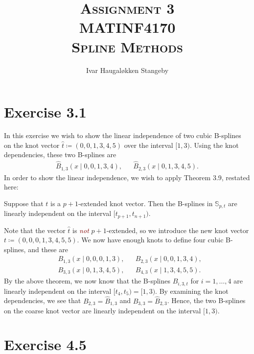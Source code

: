 \documentclass{article}
\title{\textsc{Assignment 3 \\
       MATINF4170 \\
       Spline Methods}
}
\author{Ivar Haugal{\o}kken Stangeby}
\renewcommand{\S}{\mathbb{S}}
\let\oldemph\emph
\renewcommand{\emph}[1]{\textcolor{Maroon}{\oldemph{#1}}}
\begin{document}
    \maketitle 
    
    \section*{Exercise 3.1}
    
    In this exercise we wish to show the linear independence of two cubic
    B-splines on the knot vector $\hat{t} \coloneqq (0, 0, 1, 3, 4, 5)$ over
    the interval $[1, 3)$. Using the knot dependencies, these two B-splines are
    \begin{align*}
        \hat{B}_{1, 3}(x \mid 0, 0, 1, 3, 4), && \hat{B}_{2, 3}(x \mid 0, 1, 3,
        4, 5).
    \end{align*}
    In order to show the linear independence, we wish to apply Theorem 3.9,
    restated here:
    
    \begin{theorem}[3.9]
        Suppose that $t$ is a $p + 1$-extended knot vector. Then the B-splines
        in $\S_{p, t}$ are linearly independent on the interval $[t_{p+1},
        t_{n+1})$.
    \end{theorem}
    
    Note that the vector $\hat{t}$ is \emph{not} $p+1$-extended, so we
    introduce the new knot vector $t \coloneqq (0, 0, 0, 1, 3, 4, 5, 5)$.  We
    now have enough knots to define four cubic B-splines, and these are
    \begin{align*}
        &B_{1, 3}(x \mid 0, 0, 0, 1, 3), & &B_{2, 3}(x \mid 0, 0, 1, 3, 4), \\
        &B_{3, 3}(x \mid 0, 1, 3, 4, 5), & &B_{4, 3}(x \mid 1, 3, 4, 5, 5).
    \end{align*}
    By the above theorem, we now know that the B-splines $B_{i, 3, t}$ for $i =
    1, \ldots, 4$ are linearly independent on the interval $[t_{4}, t_{5}) =
    [1, 3)$.  By examining the knot dependencies, we see that $B_{2, 3} =
    \hat{B}_{1, 3}$ and $B_{3, 3} = \hat{B}_{2, 3}$. Hence, the two B-splines
    on the coarse knot vector are linearly independent on the interval $[1,
    3)$.
    
    \section*{Exercise 4.5}
    
\end{document}
